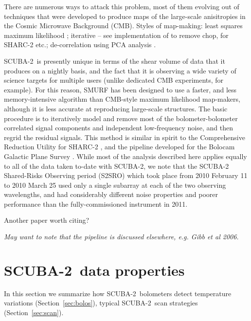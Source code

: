 \documentclass[useAMS,usenatbib,nofootinbib]{mn2e}
\newcommand{\scuba}{SCUBA-2}
\begin{document}
There are numerous ways to attack this problem, most of them evolving
out of techniques that were developed to produce maps of the
large-scale anisitropies in the Cosmic Microwave Background (CMB).
Styles of map-making: least squares \citep{janssen1992} maximum
likelihood \citep[e.g.,][]{patanchon2008}; iterative -- see
\citet{johnstone2000} implementation of \citet{wright1996} to remove
chop, \citet{kovacs2008} for SHARC-2 etc.; de-correlation using PCA
analysis \citep[e.g.][]{laurent2005,scott2008,aguirre2010}.

\scuba\ is presently unique in terms of the shear volume of data that
it produces on a nightly basis, and the fact that it is observing a
wide variety of science targets for multiple users (unlike dedicated
CMB experiments, for example). For this reason, SMURF has been
designed to use a faster, and less memory-intensive algorithm than
CMB-style maximum likelihood map-makers, although it is less accurate
at reproducing large-scale structures. The basic procedure is to
iteratively model and remove most of the bolometer-bolometer
correlated signal components and independent low-frequency noise, and
then regrid the residual signals. This method is similar in spirit to
the Comprehensive Reduction Utility for SHARC-2
\citep[CRUSH,][]{kovacs2008}, and the pipeline developed for the
Bolocam Galactic Plane Survey \citep{aguirre2010}. While most of the
analysis described here applies equally to all of the data taken
to-date with \scuba, we note that the SCUBA-2 Shared-Risks Observing
period (S2SRO) which took place from 2010 February 11 to 2010 March 25
used only a single subarray at each of the two observing wavelengths,
and had considerably different noise properties and poorer performance
than the fully-commissioned instrument in 2011.

Another paper worth citing? \citet{weferling2002}

\textit{May want to note that the pipeline is discussed elsewhere,
  e.g. Gibb et al 2006.}

\section{\scuba\ data properties}
\label{sec:data}

In this section we summarize how \scuba\ bolometers detect temperature
variations (Section~\ref{sec:bolos}), typical \scuba\ scan strategies
(Section~\ref{sec:scan}).
\end{document}
